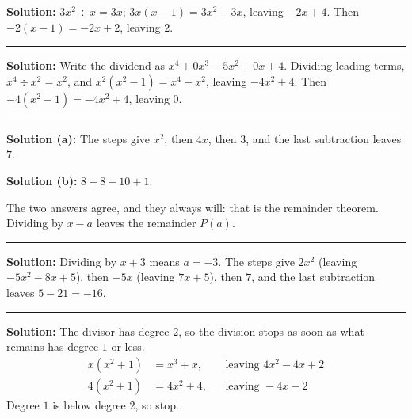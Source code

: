 \documentclass[12pt]{article}
\begin{document}
\textbf{Solution:} $3x^{2} \div x = 3x$; $3x(x - 1) = 3x^{2} - 3x$, leaving
$-2x + 4$. Then $-2(x - 1) = -2x + 2$, leaving $2$.

\vspace{0.15cm}
\noindent\rule{\linewidth}{0.2pt}


\textbf{Solution:} Write the dividend as $x^{4} + 0x^{3} - 5x^{2} + 0x + 4$.
Dividing leading terms, $x^{4} \div x^{2} = x^{2}$, and
$x^{2}(x^{2} - 1) = x^{4} - x^{2}$, leaving $-4x^{2} + 4$. Then
$-4(x^{2} - 1) = -4x^{2} + 4$, leaving $0$. 

\vspace{0.15cm}
\noindent\rule{\linewidth}{0.2pt}


\textbf{Solution (a):} The steps give $x^{2}$, then $4x$, then $3$, and the last
subtraction leaves $7$.

\textbf{Solution (b):} $8 + 8 - 10 + 1$. 

\noindent The two answers agree, and they always will: that is the remainder
theorem. Dividing by $x - a$ leaves the remainder $P(a)$.

\vspace{0.15cm}
\noindent\rule{\linewidth}{0.2pt}


\textbf{Solution:} Dividing by $x + 3$ means $a = -3$. The steps give $2x^{2}$
(leaving $-5x^{2} - 8x + 5$), then $-5x$ (leaving $7x + 5$), then $7$, and the
last subtraction leaves $5 - 21 = -16$.

\vspace{0.15cm}
\noindent\rule{\linewidth}{0.2pt}


\textbf{Solution:} The divisor has degree $2$, so the division stops as soon as
what remains has degree $1$ or less.
\begin{align*}
  x(x^{2} + 1) &= x^{3} + x,  &&\text{leaving } 4x^{2} - 4x + 2 \\
  4(x^{2} + 1) &= 4x^{2} + 4, &&\text{leaving } -4x - 2
\end{align*}
Degree $1$ is below degree $2$, so stop.
\end{document}
